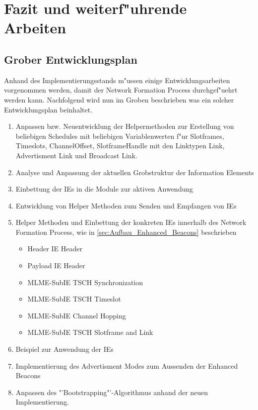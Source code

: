\section{Fazit und weiterf"uhrende Arbeiten} \label{Kap5-6}


\subsection{Grober Entwicklungsplan}

Anhand des Implementierungsstands m"ussen einige Entwicklungsarbeiten vorgenommen
werden, damit der Network Formation Process durchgef"uehrt werden kann. Nachfolgend
wird nun im Groben beschrieben was ein solcher Entwicklungsplan beinhaltet.

\begin{enumerate}
  \item Anpassen bzw. Neuentwicklung der Helpermethoden zur Erstellung
  von beliebigen Schedules mit beliebigen Variablenwerten f"ur Slotframes, Timeslots,
  ChannelOffset, SlotframeHandle mit den Linktypen Link, Advertisment Link und
  Broadcast Link.
  \item Analyse und Anpassung der aktuellen Grobstruktur der Information Elements
  \item Einbettung der IEs in die Module zur aktiven Anwendung
  \item Entwicklung von Helper Methoden zum Senden und Empfangen von IEs
  \item Helper Methoden und Einbettung der konkreten IEs innerhalb des Network
  Formation Process, wie in \ref{sec:Aufbau_Enhanced_Beacons} beschrieben
  \begin{itemize}
    \item Header IE Header
    \item Payload IE Header
    \item MLME-SubIE TSCH Synchronization
    \item MLME-SubIE TSCH Timeslot
    \item MLME-SubIE Channel Hopping
    \item MLME-SubIE TSCH Slotframe and Link
  \end{itemize}
  \item Beispiel zur Anwendung der IEs
  \item Implementierung des Advertisment Modes zum Aussenden der Enhanced Beacons
  \item Anpassen des "'Bootstrapping"'-Algorithmus anhand der neuen Implementierung.
\end{enumerate}

